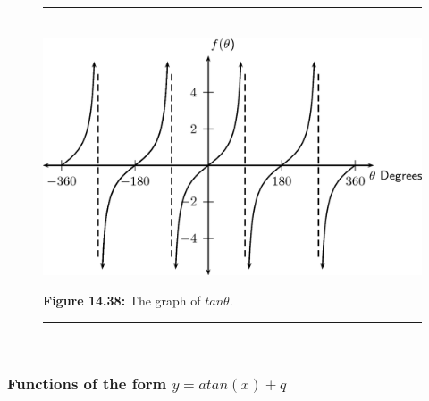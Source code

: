     \setcounter{subfigure}{0}


	\begin{figure}[H] %
    \begin{center}
    \rule[.1in]{\figurerulewidth}{.005in} \\
        \label{m39414*uid71!!!underscore!!!media}\label{m39414*uid71!!!underscore!!!printimage}\includegraphics{col11306.imgs/m39414_MG10C15_044.png} %
        
      \vspace{2pt}
    \vspace{\rubberspace}\par \begin{cnxcaption}
	  \small \textbf{Figure 14.38: }The graph of \begin{math}tan\theta \end{math}.
	\end{cnxcaption}
      
    \vspace{.1in}
    \rule[.1in]{\figurerulewidth}{.005in} \\
        
    \end{center}

 \end{figure}   

    \addtocounter{footnote}{-0}
    
      
      \label{m39414*uid72}
            \subsubsection{ Functions of the form $y=atan\left(x\right)+q$}
            \nopagebreak
            
